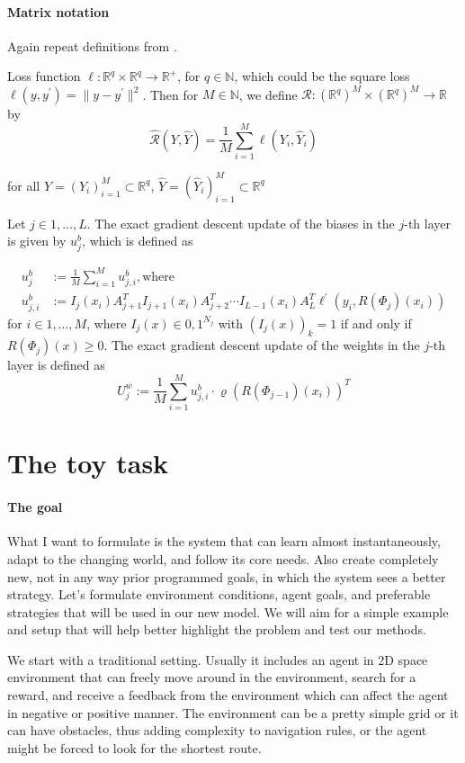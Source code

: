 \documentclass[draft]{article}
\def\RealSet{\mathbb{R}}
\begin{document}
\paragraph{Matrix notation}
Again repeat definitions from \cite{Karner:2022}.

Loss function $\ell \colon \RealSet^q \times  \RealSet^q \rightarrow  \RealSet^{+}$, for $q \in \mathbb{N}$, which could be the square loss $\ell(y,y^\prime)=\| y - y^\prime \|^2$. Then for $M \in \mathbb{N}$, we define $\mathcal{R} \colon (\RealSet^q)^M \times (\RealSet^q)^M \rightarrow \RealSet$ by
\[
\hat{\mathcal{R}} (Y,\hat Y) = \frac1{M} \sum_{i=1}^M \ell(Y_i, \hat Y_i)
\]

for all $Y=(Y_i)_{i=1}^M \subset \RealSet^q$, $\hat Y = (\hat Y_i)_{i=1}^M \subset \RealSet^q$

Let $j \in {1,\ldots,L}$. The exact gradient descent update of the biases in the $j$-th layer is given by $u_j^b$, which is defined as

\begin{align}
u_j^b &:= \frac1{M} \sum_{i=1}^M u_{j,i}^b, \text{where} \\
u_{j,i}^b &:= I_j(x_i)A_{j+1}^T I_{j+1}(x_i) A_{j+2}^T \cdots I_{L-1}(x_i)A_L^T \ell^\prime(y_i, R(\Phi_j)(x_i))
\end{align}
for $i\in {1,\ldots,M}$, where $I_j(x)\in{0,1}^{N_j}$ with $(I_j(x))_k = 1$ if and only if $R(\Phi_j)(x)\geqslant 0$.
The exact gradient descent update of the weights in the $j$-th layer is defined as
\[
U_j^w := \frac{1}{M} \sum_{i=1}^{M} u_{j,i}^b \cdot \varrho(R(\Phi_{j-1})(x_i))^T
\]


\section{The toy task}

\paragraph{The goal}
What I want to formulate is the system that can learn almost instantaneously, adapt to the changing world, and follow its core needs. Also create completely new, not in any way prior programmed goals, in which the system sees a better strategy. Let’s formulate environment conditions, agent goals, and preferable strategies that will be used in our new model. We will aim for a simple example and setup that will help better highlight the problem and test our methods.

We start with a traditional setting. Usually it includes an agent in 2D space environment that can freely move around in the environment, search for a reward, and receive a feedback from the environment which can affect the agent in negative or positive manner. The environment can be a pretty simple grid or it can have obstacles, thus adding complexity to navigation rules, or the agent might be forced to look for the shortest route.
\end{document}
